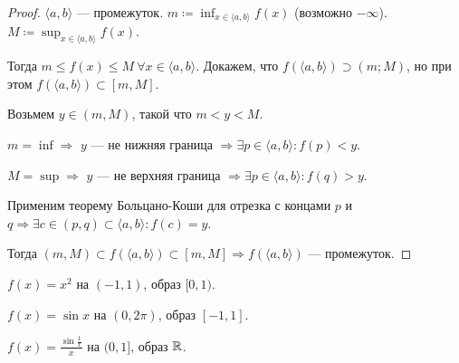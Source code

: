 \begin{proof}
    $\langle a, b \rangle$ --- промежуток.  $m \coloneqq \inf_{x \in \langle a, b \rangle} f(x)$ (возможно $-\infty$). $M \coloneqq \sup_{x \in \langle a, b \rangle} f(x)$.

    Тогда  $m \le f(x) \le M\ \forall x \in \langle a, b \rangle$. Докажем, что $f(\langle a, b \rangle) \supset (m; M)$, но при этом  $f(\langle a, b \rangle) \subset [m, M]$. 

    Возьмем  $y \in (m, M)$, такой что  $m < y < M$.  

    $m = \inf \Rightarrow$ $y$ ---  не нижняя граница $\Rightarrow \exists p \in \langle a, b \rangle\!: f(p) < y$. 

    $M = \sup \Rightarrow$ $y$ ---  не верхняя граница $\Rightarrow \exists p \in \langle a, b \rangle\!: f(q) > y$.

    Применим теорему Больцано-Коши для отрезка с концами $p$ и  $q \Rightarrow \exists c \in (p, q) \subset \langle a, b \rangle\!: f(c)=y$. 

    Тогда $(m, M) \subset f(\langle a, b \rangle) \subset [m, M] \Rightarrow f(\langle a, b \rangle)$ --- промежуток. 
\end{proof}
\begin{remark}
    $f(x) = x^2$ на  $(-1, 1)$, образ  $[0, 1)$.

    $f(x) = \sin x$ на  $(0, 2\pi)$, образ $[-1, 1]$.

    $f(x) = \frac{\sin \frac{1}{x}}{x}$ на $(0, 1]$, образ  $\mathbb{R}$.
\end{remark}

